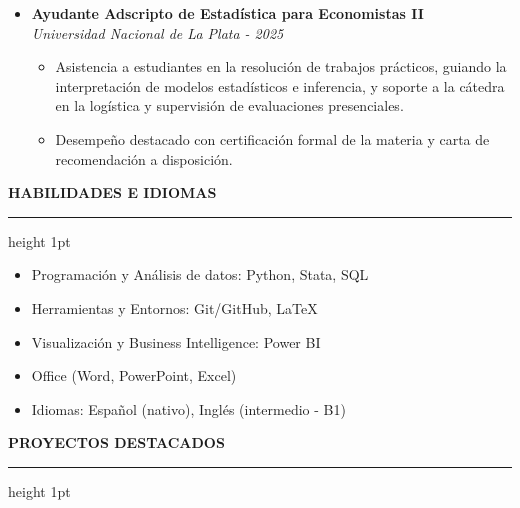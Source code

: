 \documentclass[11pt, a4paper]{article}
\begin{document}
\begin{itemize}[label=\small$\bullet$, leftmargin=1.4em, itemsep=0.8em]
\color{darktext}
    \item {\large \textbf{Ayudante Adscripto de Estadística para Economistas II}}\\
    {\color{subtext}\textit{Universidad Nacional de La Plata - 2025}}
    \begin{itemize}[label=\tiny$\bullet$]
        \item {\large \color{subtext} Asistencia a estudiantes en la resolución de trabajos prácticos, guiando la interpretación de modelos estadísticos e inferencia, y soporte a la cátedra en la logística y supervisión de evaluaciones presenciales.}
        \item {\large \color{subtext} Desempeño destacado con certificación formal de la materia y carta de recomendación a disposición.}
    \end{itemize}

\end{itemize}

\vspace{1.0em}



{\Large \color{darktext} \bfseries \faPuzzlePiece\hspace{0.5em} HABILIDADES E IDIOMAS}
\vspace{0.4em}
\hrule height 1pt \color{linecolor}
\vspace{0.2em}

\begin{itemize}[label=\small$\bullet$, leftmargin=1.4em, itemsep=5pt]
    \color{darktext}
    \item {\large Programación y Análisis de datos: Python, Stata, SQL}
    \item {\large Herramientas y Entornos: Git/GitHub, LaTeX}
    \item {\large Visualización y Business Intelligence: Power BI}    
    \item {\large Office (Word, PowerPoint, Excel)}
    \item {\large Idiomas: Español (nativo), Inglés (intermedio - B1)}
\end{itemize}

\vspace{1.5em}


{\Large \color{darktext} \bfseries \faGlobe\hspace{0.5em} PROYECTOS DESTACADOS}
\vspace{0.4em}
\hrule height 1pt \color{linecolor}
\vspace{0.2em}
\end{document}
